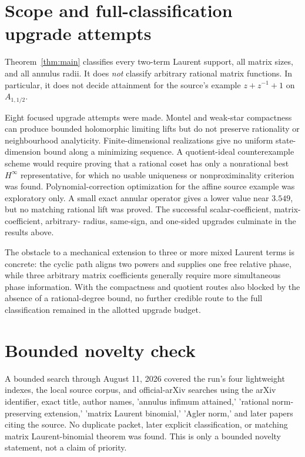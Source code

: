 \documentclass[11pt]{article}
\begin{document}
\section*{Scope and full-classification upgrade attempts}

Theorem~\ref{thm:main} classifies every two-term Laurent support, all matrix
sizes, and all annulus radii.  It does \emph{not} classify arbitrary rational
matrix functions.  In particular, it does not decide attainment for the
source's example \(z+z^{-1}+1\) on \(A_{1,1/2}\).

Eight focused upgrade attempts were made.  Montel and weak-star compactness
can produce bounded holomorphic limiting lifts but do not preserve rationality
or neighbourhood analyticity.  Finite-dimensional realizations give no
uniform state-dimension bound along a minimizing sequence.  A quotient-ideal
counterexample scheme would require proving that a rational coset has only a
nonrational best \(H^\infty\) representative, for which no usable uniqueness
or nonproximinality criterion was found.  Polynomial-correction optimization
for the affine source example was exploratory only.  A small exact annular
operator gives a lower value near \(3.549\), but no matching rational lift was
proved.  The successful scalar-coefficient, matrix-coefficient, arbitrary-
radius, same-sign, and one-sided upgrades culminate in the results above.

The obstacle to a mechanical extension to three or more mixed Laurent terms
is concrete: the cyclic path aligns two powers and supplies one free relative
phase, while three arbitrary matrix coefficients generally require more
simultaneous phase information.  With the compactness and quotient routes also
blocked by the absence of a rational-degree bound, no further credible route
to the full classification remained in the allotted upgrade budget.

\section*{Bounded novelty check}

A bounded search through August 11, 2026 covered the run's four lightweight
indexes, the local source corpus, and official-arXiv searches using the arXiv
identifier, exact title, author names, 'annulus infimum attained,' 'rational
norm-preserving extension,' 'matrix Laurent binomial,' 'Agler norm,' and
later papers citing the source.  No duplicate packet, later explicit
classification, or matching matrix Laurent-binomial theorem was found.  This
is only a bounded novelty statement, not a claim of priority.
\end{document}
